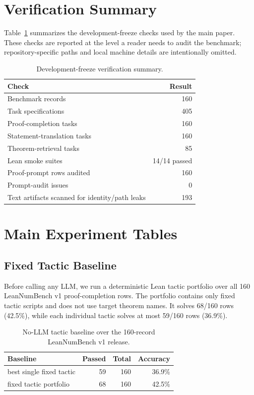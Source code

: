 \section{Verification Summary}

Table~\ref{tab:supp-verification-summary} summarizes the development-freeze
checks used by the main paper. These checks are reported at the level a reader
needs to audit the benchmark; repository-specific paths and local machine
details are intentionally omitted.

\begin{table}[htbp]
\centering
\caption{Development-freeze verification summary.}
\label{tab:supp-verification-summary}
\begin{tabular}{lr}
\toprule
Check & Result\\
\midrule
Benchmark records & 160\\
Task specifications & 405\\
Proof-completion tasks & 160\\
Statement-translation tasks & 160\\
Theorem-retrieval tasks & 85\\
Lean smoke suites & 14/14 passed\\
Proof-prompt rows audited & 160\\
Prompt-audit issues & 0\\
Text artifacts scanned for identity/path leaks & 193\\
\bottomrule
\end{tabular}
\end{table}

\section{Main Experiment Tables}

\subsection{Fixed Tactic Baseline}

Before calling any LLM, we run a deterministic Lean tactic portfolio over all
160 LeanNumBench v1 proof-completion rows. The portfolio contains only fixed tactic
scripts and does not use target theorem names. It solves 68/160 rows (42.5\%),
while each individual tactic solves at most 59/160 rows (36.9\%).

\begin{table}[H]
\centering
\caption{No-LLM tactic baseline over the 160-record LeanNumBench v1 release.}
\label{tab:supp-tactic-baseline}
\small
\begin{tabular}{lrrr}
\toprule
Baseline & Passed & Total & Accuracy\\
\midrule
best single fixed tactic & 59 & 160 & 36.9\%\\
fixed tactic portfolio & 68 & 160 & 42.5\%\\
\bottomrule
\end{tabular}
\end{table}

